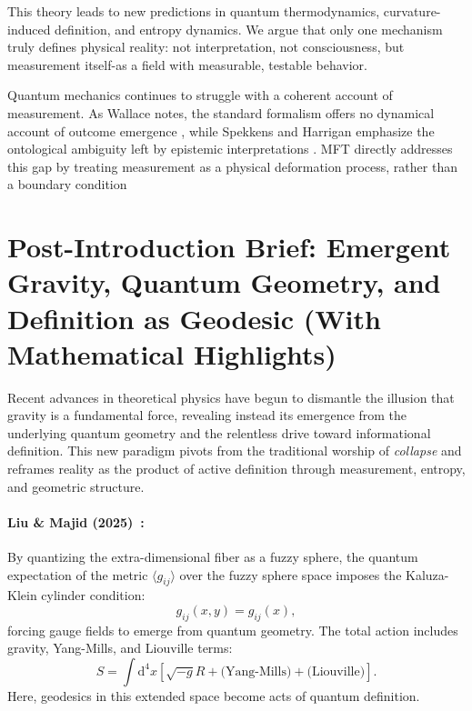 This theory leads to new predictions in quantum thermodynamics, curvature-induced definition, and entropy dynamics. We argue that only one mechanism truly defines physical reality: not interpretation, not consciousness, but measurement itself-as a field with measurable, testable behavior.

Quantum mechanics continues to struggle with a coherent account of measurement. As Wallace notes, the standard formalism offers no dynamical account of outcome emergence \cite{wallace_everettian_2012}, while Spekkens and Harrigan emphasize the ontological ambiguity left by epistemic interpretations \cite{harrigan_puzzling_2010}. MFT directly addresses this gap by treating measurement as a physical deformation process, rather than a boundary condition

\section*{Post-Introduction Brief: Emergent Gravity, Quantum Geometry, and Definition as Geodesic (With Mathematical Highlights)}

Recent advances in theoretical physics have begun to dismantle the illusion that gravity is a fundamental force, revealing instead its emergence from the underlying quantum geometry and the relentless drive toward informational definition. This new paradigm pivots from the traditional worship of \emph{collapse} and reframes reality as the product of active definition through measurement, entropy, and geometric structure.

\paragraph{Liu \& Majid (2025)~\cite{liu_kaluza-klein_2025}:} By quantizing the extra-dimensional fiber as a fuzzy sphere, the quantum expectation of the metric $\langle g_{ij} \rangle$ over the fuzzy sphere space imposes the Kaluza-Klein cylinder condition:
\begin{equation}
g_{ij}(x, y) = g_{ij}(x),
\end{equation}
forcing gauge fields to emerge from quantum geometry. The total action includes gravity, Yang-Mills, and Liouville terms:
\begin{equation}
S = \int \mathrm{d}^4 x \left[ \sqrt{-g} R + \text{(Yang-Mills)} + \text{(Liouville)} \right].
\end{equation}
Here, geodesics in this extended space become acts of quantum definition.

